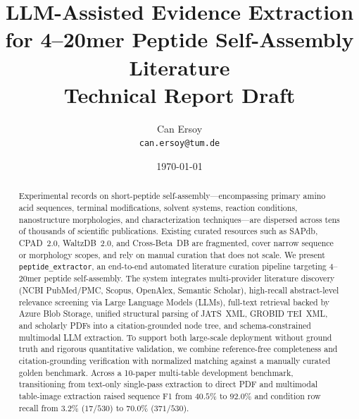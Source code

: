 \documentclass[11pt,a4paper]{article}
\title{%
    \textbf{LLM-Assisted Evidence Extraction for 4--20mer Peptide Self-Assembly Literature}\\[0.5em]
    \large Technical Report Draft
}
\author{%
    Can Ersoy\\
    \texttt{can.ersoy@tum.de}
}
\date{\today}
\begin{document}
\maketitle

\begin{abstract}
Experimental records on short-peptide self-assembly---encompassing primary amino acid sequences, terminal modifications, solvent systems, reaction conditions, nanostructure morphologies, and characterization techniques---are dispersed across tens of thousands of scientific publications. Existing curated resources such as SAPdb, CPAD~2.0, WaltzDB~2.0, and Cross-Beta~DB are fragmented, cover narrow sequence or morphology scopes, and rely on manual curation that does not scale. We present \texttt{peptide\_extractor}, an end-to-end automated literature curation pipeline targeting 4--20mer peptide self-assembly. The system integrates multi-provider literature discovery (NCBI PubMed/PMC, Scopus, OpenAlex, Semantic Scholar), high-recall abstract-level relevance screening via Large Language Models (LLMs), full-text retrieval backed by Azure Blob Storage, unified structural parsing of JATS~XML, GROBID TEI~XML, and scholarly PDFs into a citation-grounded node tree, and schema-constrained multimodal LLM extraction. To support both large-scale deployment without ground truth and rigorous quantitative validation, we combine reference-free completeness and citation-grounding verification with normalized matching against a manually curated golden benchmark. Across a 10-paper multi-table development benchmark, transitioning from text-only single-pass extraction to direct PDF and multimodal table-image extraction raised sequence F1 from $40.5\%$ to $92.0\%$ and condition row recall from $3.2\%$ ($17/530$) to $70.0\%$ ($371/530$).
\end{abstract}

\tableofcontents
\newpage












\end{document}
